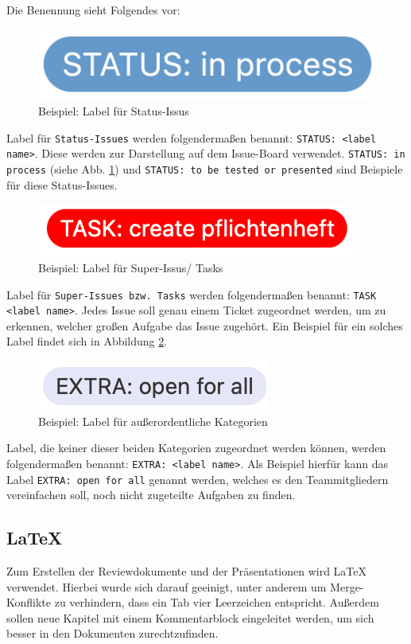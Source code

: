 \documentclass[../review_3.tex]{subfiles}
\begin{document}
Die Benennung sieht Folgendes vor:

\begin{figure} [h]
    \centering
    \includegraphics[width = 0.2\linewidth]{img/status.png}
    \caption{Beispiel: Label für Status-Issus}
    \label{status}
\end{figure}
Label für \texttt{Status-Issues} werden folgendermaßen benannt: \texttt{STATUS: <label name>}. Diese werden zur Darstellung auf dem Issue-Board verwendet. \texttt{STATUS: in process} (siehe Abb. \ref{status}) und \texttt{STATUS: to be tested or presented} sind Beispiele für diese Status-Issues.

\begin{figure} [h]
    \centering
    \includegraphics[width = 0.26\linewidth]{img/task.png}
    \caption{Beispiel: Label für Super-Issus/ Tasks}
    \label{task}
\end{figure}
Label für \texttt{Super-Issues bzw. Tasks} werden folgendermaßen benannt: \texttt{TASK <label name>}. Jedes Issue soll genau einem Ticket zugeordnet werden, um zu erkennen, welcher großen Aufgabe das Issue zugehört. Ein Beispiel für ein solches Label findet sich in Abbildung \ref{task}.

\begin{figure} [h]
    \centering
    \includegraphics[width = 0.23\linewidth]{img/extra.png}
    \caption{Beispiel: Label für außerordentliche Kategorien}
    \label{extra}
\end{figure}
Label, die keiner dieser beiden Kategorien zugeordnet werden können, werden folgendermaßen benannt: \texttt{EXTRA: <label name>}. Als Beispiel hierfür kann das Label \texttt{EXTRA: open for all} genannt werden, welches es den Teammitgliedern vereinfachen soll, noch nicht zugeteilte Aufgaben zu finden.

\subsection{LaTeX}
Zum Erstellen der Reviewdokumente und der Präsentationen wird LaTeX verwendet. Hierbei wurde sich darauf geeinigt, unter anderem um Merge-Konflikte zu verhindern, dass ein Tab vier Leerzeichen entspricht. Außerdem sollen neue Kapitel mit einem Kommentarblock eingeleitet werden, um sich besser in den Dokumenten zurechtzufinden.
\end{document}
